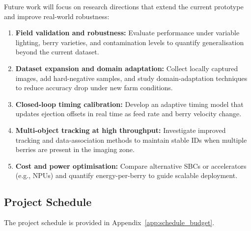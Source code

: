 Future work will focus on research directions that extend the current prototype and
improve real-world robustness:

\begin{enumerate}
  \item \textbf{Field validation and robustness:} Evaluate performance under variable
    lighting, berry varieties, and contamination levels to quantify generalisation
    beyond the current dataset.
  \item \textbf{Dataset expansion and domain adaptation:} Collect locally captured
    images, add hard-negative samples, and study domain-adaptation techniques to
    reduce accuracy drop under new farm conditions.
  \item \textbf{Closed-loop timing calibration:} Develop an adaptive timing model that
    updates ejection offsets in real time as feed rate and berry velocity change.
  \item \textbf{Multi-object tracking at high throughput:} Investigate improved tracking
    and data-association methods to maintain stable IDs when multiple berries are
    present in the imaging zone.
  \item \textbf{Cost and power optimisation:} Compare alternative SBCs or accelerators
    (e.g., NPUs) and quantify energy-per-berry to guide scalable deployment.
\end{enumerate}

\subsection{Project Schedule}

The project schedule is provided in Appendix~\ref{app:schedule_budget}.
